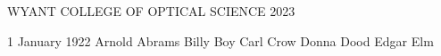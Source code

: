 \documentclass[dissertation,CC-BY-ND,generatedon]{uathesis}
\begin{document}
\maketitlepage%
{WYANT COLLEGE OF OPTICAL SCIENCE} %
{2023} %

\approval%
{1 January 1922}		%
{Arnold Abrams}		%
{Billy Boy}		%
{Carl Crow}		%
{Donna Dood}		    %
{Edgar Elm} %
{} %



\tableofcontents

\listoffigures

\listoftables




\appendix


\printbibliography
\end{document}
